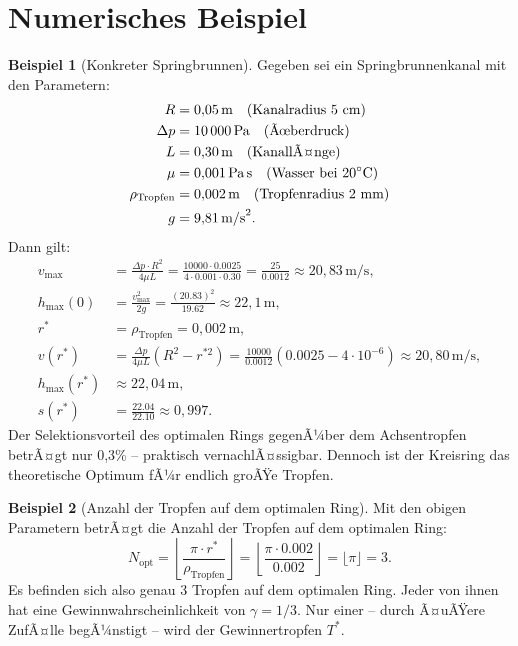 ﻿\documentclass[a4paper,12pt]{article}
\theoremstyle{definition}
\newtheorem{beispiel}{Beispiel}
\begin{document}
\section{Numerisches Beispiel}

\begin{beispiel}[Konkreter Springbrunnen]
    Gegeben sei ein Springbrunnenkanal mit den Parametern:
    \begin{align*}
        R &= 0{,}05\,\text{m} \quad \text{(Kanalradius 5 cm)} \\
        \Delta p &= 10\,000\,\text{Pa} \quad \text{(Ãœberdruck)} \\
        L &= 0{,}30\,\text{m} \quad \text{(KanallÃ¤nge)} \\
        \mu &= 0{,}001\,\text{Pa\,s} \quad \text{(Wasser bei }20^\circ\text{C)} \\
        \rho_{\text{Tropfen}} &= 0{,}002\,\text{m} \quad \text{(Tropfenradius 2 mm)} \\
        g &= 9{,}81\,\text{m/s}^2.
    \end{align*}
    Dann gilt:
    \begin{align*}
        v_{\max} &= \frac{\Delta p \cdot R^2}{4\mu L}
        = \frac{10000 \cdot 0.0025}{4 \cdot 0.001 \cdot 0.30}
        = \frac{25}{0.0012} \approx 20{,}83\,\text{m/s}, \\[4pt]
        h_{\max}(0) &= \frac{v_{\max}^2}{2g} = \frac{(20.83)^2}{19.62} \approx 22{,}1\,\text{m}, \\[4pt]
        r^* &= \rho_{\text{Tropfen}} = 0{,}002\,\text{m}, \\[4pt]
        v(r^*) &= \frac{\Delta p}{4\mu L}(R^2 - r^{*2})
        = \frac{10000}{0.0012}\left(0.0025 - 4\cdot 10^{-6}\right)
        \approx 20{,}80\,\text{m/s}, \\[4pt]
        h_{\max}(r^*) &\approx 22{,}04\,\text{m}, \\[4pt]
        s(r^*) &= \frac{22.04}{22.10} \approx 0{,}997.
    \end{align*}
    Der Selektionsvorteil des optimalen Rings gegenÃ¼ber dem Achsentropfen betrÃ¤gt
    nur 0,3\% -- praktisch vernachlÃ¤ssigbar. Dennoch ist der Kreisring das theoretische
    Optimum fÃ¼r endlich groÃŸe Tropfen.
\end{beispiel}

\begin{beispiel}[Anzahl der Tropfen auf dem optimalen Ring]
    Mit den obigen Parametern betrÃ¤gt die Anzahl der Tropfen auf dem optimalen Ring:
    \[
    N_{\text{opt}} = \left\lfloor \frac{\pi \cdot r^*}{\rho_{\text{Tropfen}}} \right\rfloor
    = \left\lfloor \frac{\pi \cdot 0.002}{0.002} \right\rfloor = \lfloor \pi \rfloor = 3.
    \]
    Es befinden sich also genau 3 Tropfen auf dem optimalen Ring. Jeder von ihnen hat
    eine Gewinnwahrscheinlichkeit von $\gamma = 1/3$. Nur einer -- durch Ã¤uÃŸere ZufÃ¤lle
    begÃ¼nstigt -- wird der Gewinnertropfen $T^*$.
\end{beispiel}
\end{document}
